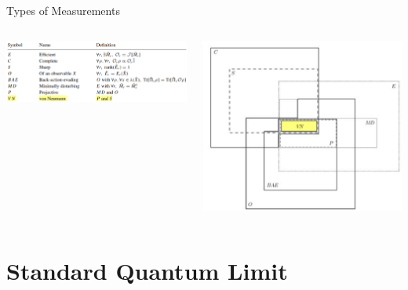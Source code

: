 \documentclass[
]{beamer}
\begin{document}
\begin{frame}{Types of Measurements}
	\begin{columns}
		\includegraphics[width=\textwidth]{figures/types_table.png}

		\includegraphics[width=\textwidth]{figures/types_ven.png}
	\end{columns}
\end{frame}

\section{Standard Quantum Limit}

\end{document}
